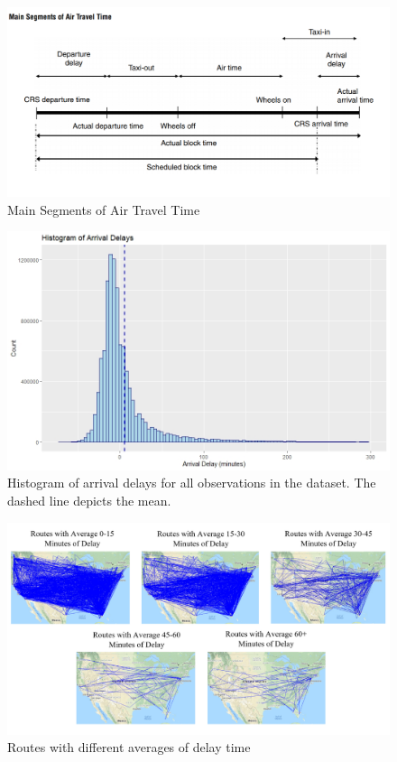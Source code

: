 \documentclass[12pt, a4paper, openany]{book}
\begin{document}
			\begin{figure}[h]
			\centering
	 		\includegraphics[width = 1 \textwidth]{../figures/Main Segments of Air Travel Time}
	 		\caption{Main Segments of Air Travel Time}
	 		\end{figure}
			\begin{figure}[h]
			\centering
			\includegraphics[width = 1\textwidth]{../figures/PLOTS FOR REPORT/Chapter 4/Figure 4.1}
			 \caption{Histogram of arrival delays for all observations in the dataset. The dashed line depicts the mean.}
			 \end{figure}

			\begin{figure}[h]
			\centering
	 		\includegraphics[width = 1 \textwidth]{../figures/PLOTS FOR REPORT/Chapter 4/Figure 4.21}
	 		\caption{Routes with different averages of delay time}
	 		\end{figure}
\end{document}

